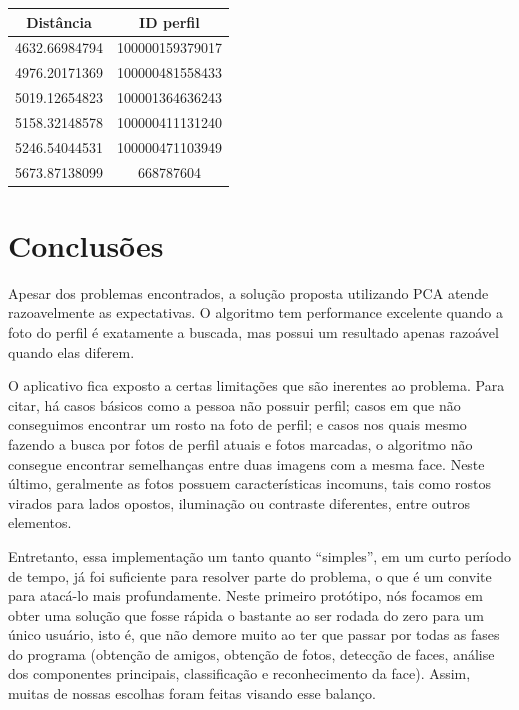 \documentclass[10pt,a4paper]{article}
\begin{document}
\begin{enumerate}
\begin{table}[h!]
\begin{center}
\begin{tabular}{cc}
Distância & ID perfil \\
\hline
4632.66984794 & 100000159379017\\
4976.20171369 & 100000481558433\\
5019.12654823 & 100001364636243\\
5158.32148578 & 100000411131240\\
5246.54044531 & 100000471103949\\
5673.87138099 & 668787604
\end{tabular}
\end{center}
\end{table}

\end{enumerate}

\section{Conclusões}
Apesar dos problemas encontrados, a solução proposta utilizando PCA atende razoavelmente as expectativas. O algoritmo tem performance excelente quando a foto do perfil é exatamente a buscada, mas possui um resultado apenas razoável quando elas diferem.

	O aplicativo fica exposto a certas limitações que são inerentes ao problema. Para citar, há casos básicos como a pessoa não possuir perfil; casos em que não conseguimos encontrar um rosto na foto de perfil; e casos nos quais mesmo fazendo a busca por fotos de perfil atuais e fotos marcadas, o algoritmo não consegue encontrar semelhanças entre duas imagens com a mesma face. Neste último, geralmente as fotos possuem características incomuns, tais como rostos virados para lados opostos, iluminação ou contraste diferentes, entre outros elementos.

	Entretanto, essa implementação um tanto quanto “simples”, em um curto período de tempo, já foi suficiente para resolver parte do problema, o que é um convite para atacá-lo mais profundamente. Neste primeiro protótipo, nós focamos em obter uma solução que fosse rápida o bastante ao ser rodada do zero para um único usuário, isto é, que não demore muito ao ter que passar por todas as fases do programa (obtenção de amigos, obtenção de fotos, detecção de faces, análise dos componentes principais, classificação e reconhecimento da face). Assim, muitas de nossas escolhas foram feitas visando esse balanço.
\end{document}
